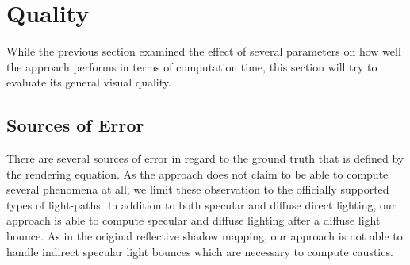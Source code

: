\documentclass[thesis.tex]{subfiles}
\begin{document}
\newpage
\section{Quality}
While the previous section examined the effect of several parameters on how well the approach performs in terms of computation time, this section will try to evaluate its general visual quality.

\subsection{Sources of Error} \label{sec:eva:errorsources}
There are several sources of error in regard to the ground truth that is defined by the rendering equation.
As the approach does not claim to be able to compute several phenomena at all, we limit these observation to the officially supported types of light-paths.
In addition to both specular and diffuse direct lighting, our approach is able to compute specular and diffuse lighting after a diffuse light bounce.
As in the original reflective shadow mapping, our approach is not able to handle indirect specular light bounces which are necessary to compute caustics.
\end{document}
